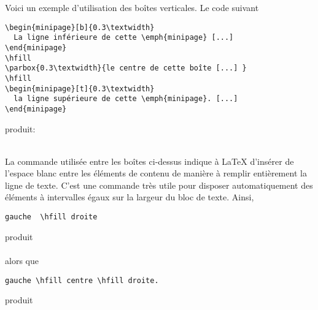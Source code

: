 Voici un exemple d'utilisation des boîtes verticales. Le code suivant

\begin{lstlisting}
\begin{minipage}[b]{0.3\textwidth}
  La ligne inférieure de cette \emph{minipage} [...]
\end{minipage}
\hfill
\parbox{0.3\textwidth}{le centre de cette boîte [...] }
\hfill
\begin{minipage}[t]{0.3\textwidth}
  la ligne supérieure de cette \emph{minipage}. [...]
\end{minipage}
\end{lstlisting}
produit: \\[0.5\baselineskip]
\begin{minipage}{\textwidth}
  \makebox[0pt][l]{\color{lightgray}\rule{\textwidth}{0.5pt}}\relax
  \hfill
  \hfill
\end{minipage} \\[0.5\baselineskip]

La commande \cmd{\hfill} utilisée entre les boîtes ci-dessus indique à
{\LaTeX} d'insérer de l'espace blanc entre les éléments de contenu de
manière à remplir entièrement la ligne de texte. C'est une commande
très utile pour disposer automatiquement des éléments à intervalles
égaux sur la largeur du bloc de texte. Ainsi,
\begin{lstlisting}
gauche  \hfill droite
\end{lstlisting}
produit \\[0.5\baselineskip]
 \\[0.5\baselineskip]
alors que
\begin{lstlisting}
gauche \hfill centre \hfill droite.
\end{lstlisting}
produit \\[0.5\baselineskip]


